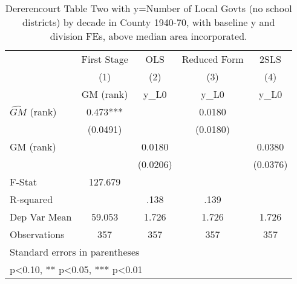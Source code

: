 \begin{table}[htbp]\centering
\def\sym#1{\ifmmode^{#1}\else\(^{#1}\)\fi}
\caption{Dererencourt Table Two with y=Number of Local Govts (no school districts) by decade in County 1940-70, with baseline y and division FEs, above median area incorporated.}
\begin{tabular}{l*{4}{c}}
\toprule
                    & First Stage   &         OLS   &Reduced Form   &        2SLS   \\
                    &\multicolumn{1}{c}{(1)}&\multicolumn{1}{c}{(2)}&\multicolumn{1}{c}{(3)}&\multicolumn{1}{c}{(4)}\\
                    &\multicolumn{1}{c}{GM  (rank)}&\multicolumn{1}{c}{y\_L0}&\multicolumn{1}{c}{y\_L0}&\multicolumn{1}{c}{y\_L0}\\
\midrule
$\hat{GM}$ (rank)   &       0.473***&               &      0.0180   &               \\
                    &    (0.0491)   &               &    (0.0180)   &               \\
\addlinespace
GM  (rank)          &               &      0.0180   &               &      0.0380   \\
                    &               &    (0.0206)   &               &    (0.0376)   \\
\midrule
F-Stat              &     127.679   &               &               &               \\
R-squared           &               &        .138   &        .139   &               \\
Dep Var Mean        &      59.053   &       1.726   &       1.726   &       1.726   \\
Observations        &         357   &         357   &         357   &         357   \\
\bottomrule
\multicolumn{5}{l}{\footnotesize Standard errors in parentheses}\\
\multicolumn{5}{l}{\footnotesize * p<0.10, ** p<0.05, *** p<0.01}\\
\end{tabular}
\end{table}
